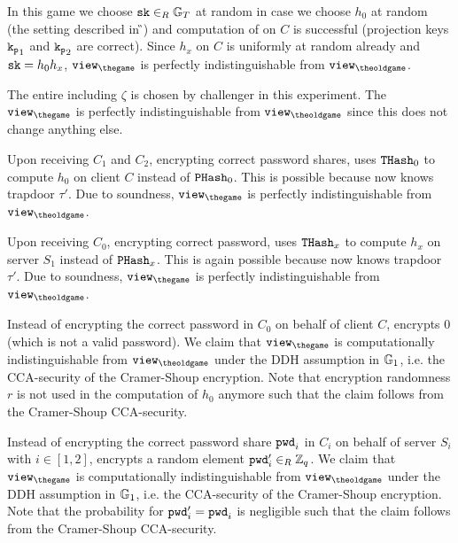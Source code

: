 \Gh In this game we choose $\mathtt{sk}\in_R\mathbb{G}_T$ at random in case we choose $h_0$ at random (the setting described in \G{\theoldgame}) and computation of \sk on $C$ is successful (projection keys $\mathtt{k_p}_1$ and $\mathtt{k_p}_2$ are correct).
Since $h_x$ on $C$ is uniformly at random already and $\mathtt{sk}=h_0h_x$, $\view_{\thegame}$ is perfectly indistinguishable from $\view_{\theoldgame}$.


\Gh The entire \crs including $\zeta$ is chosen by challenger \cC in this experiment.
The $\view_{\thegame}$ is perfectly indistinguishable from $\view_{\theoldgame}$ since this does not change anything else.

\Gh Upon receiving $C_1$ and $C_2$, encrypting correct password shares, \cC uses $\mathtt{THash}_0$ to compute $h_0$ on client $C$ instead of $\mathtt{PHash}_0$.
This is possible because \cC now knows trapdoor $\tau'$.
Due to \TDSPHF soundness, $\view_{\thegame}$ is perfectly indistinguishable from $\view_{\theoldgame}$.

\Gh Upon receiving $C_0$, encrypting correct password, \cC uses $\mathtt{THash}_x$ to compute $h_x$ on server $S_1$ instead of $\mathtt{PHash}_x$.
This is again possible because \cC now knows trapdoor $\tau'$.
Due to \TDSPHF soundness, $\view_{\thegame}$ is perfectly indistinguishable from $\view_{\theoldgame}$.

\Gh Instead of encrypting the correct password \pwd in $C_0$ on behalf of client $C$, \cC encrypts $0$ (which is not a valid password).
We claim that $\view_{\thegame}$ is computationally indistinguishable from $\view_{\theoldgame}$ under the DDH assumption in $\mathbb{G}_1$, i.e. the CCA-security of the Cramer-Shoup encryption.
Note that encryption randomness $r$ is not used in the computation of $h_0$ anymore such that the claim follows from the Cramer-Shoup CCA-security.

\Gh Instead of encrypting the correct password share $\mathtt{pwd}_i$ in $C_i$ on behalf of server $S_i$ with $i\in[1,2]$, \cC encrypts a random element $\mathtt{pwd}'_i\in_R\mathbb{Z}_q$.
We claim that $\view_{\thegame}$ is computationally indistinguishable from $\view_{\theoldgame}$ under the DDH assumption in $\mathbb{G}_1$, i.e. the CCA-security of the Cramer-Shoup encryption.
Note that the probability for $\mathtt{pwd}'_i=\mathtt{pwd}_i$ is negligible such that the claim follows from the Cramer-Shoup CCA-security.

